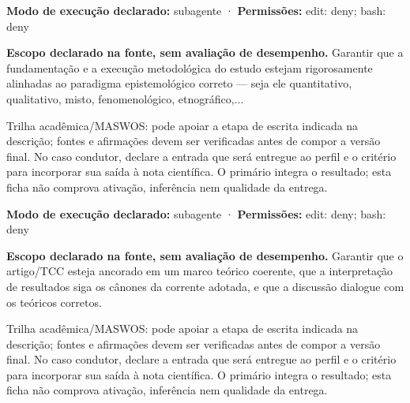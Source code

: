 \begin{arquitetura}
\textbf{Modo de execução declarado:} subagente · \textbf{Permissões:} edit: deny; bash: deny
\end{arquitetura}


\begin{descricao}
\textbf{Escopo declarado na fonte, sem avaliação de desempenho.}
Garantir que a fundamentação e a execução metodológica do estudo estejam rigorosamente alinhadas ao paradigma epistemológico correto — seja ele quantitativo, qualitativo, misto, fenomenológico, etnográfico,...
\end{descricao}

\begin{funcao}
Trilha acadêmica/MASWOS: pode apoiar a etapa de escrita indicada na descrição; fontes e afirmações devem ser verificadas antes de compor a versão final. No caso condutor, declare a entrada que será entregue ao perfil e o critério para incorporar sua saída à nota científica. O primário integra o resultado; esta ficha não comprova ativação, inferência nem qualidade da entrega.
\end{funcao}

\begin{arquitetura}
\textbf{Modo de execução declarado:} subagente · \textbf{Permissões:} edit: deny; bash: deny
\end{arquitetura}


\begin{descricao}
\textbf{Escopo declarado na fonte, sem avaliação de desempenho.}
Garantir que o artigo/TCC esteja ancorado em um marco teórico coerente, que a interpretação de resultados siga os cânones da corrente adotada, e que a discussão dialogue com os teóricos corretos.
\end{descricao}

\begin{funcao}
Trilha acadêmica/MASWOS: pode apoiar a etapa de escrita indicada na descrição; fontes e afirmações devem ser verificadas antes de compor a versão final. No caso condutor, declare a entrada que será entregue ao perfil e o critério para incorporar sua saída à nota científica. O primário integra o resultado; esta ficha não comprova ativação, inferência nem qualidade da entrega.
\end{funcao}

